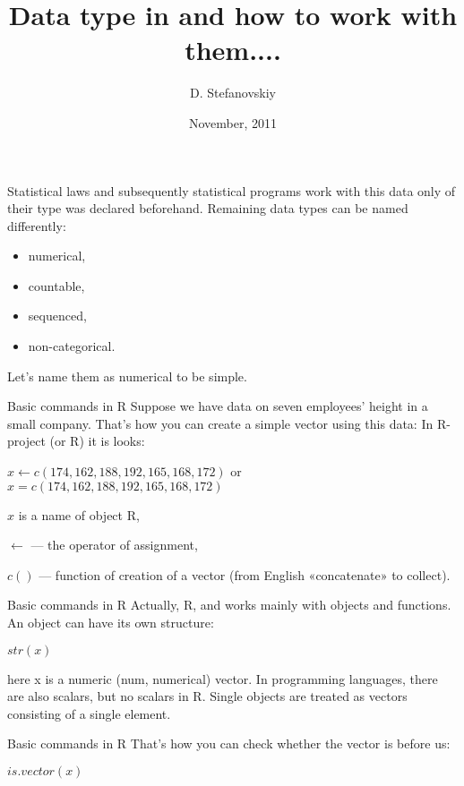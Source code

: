 \documentclass{beamer}
\title[First class]{Data type in  and how to work with them....}
\author{D. Stefanovskiy}
\institute{RANE}
\date{November, 2011}
\begin{document}
\begin{frame}{}
\titlepage
\end{frame}

\begin{frame}{}
Statistical laws and subsequently statistical programs work with this data only of their type was declared beforehand. Remaining data types can be named differently: 
\begin{itemize}
\item numerical,
\item countable,
\item sequenced,
\item non-categorical. 
\end{itemize}
Let’s name them as numerical to be simple.
\end{frame}

\begin{frame}{Basic commands in R}
Suppose we have data on seven employees’ height in a small company. That's how you can create a simple vector using this data:
In R-project (or R)  it is looks:
\\
\begin{center}

$x \leftarrow c(174, 162, 188, 192, 165, 168, 172) $
or
$x  = c(174, 162, 188, 192, 165, 168, 172)$

\end{center}

$x$ is a name of object R,

$ \leftarrow$ — the operator of assignment,

$c()$ — function of creation of a vector (from English «concatenate» to collect).

\end{frame}

\begin{frame}{Basic commands in R}
Actually, R, and works mainly with objects and functions. An object can have its own structure:
\begin{center}
$str(x)$
\end{center}
here x  is a numeric (num, numerical) vector. In programming languages, there are also scalars, but no scalars in R. Single objects are treated as vectors consisting of a single element.
\end{frame}


\begin{frame}{Basic commands in R}
That's how you can check whether the vector is before us:
\begin{center}
$is.vector(x)$
\end{center}


\end{frame}
\end{document}
